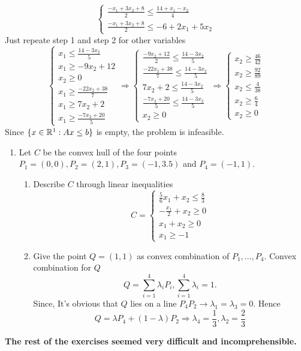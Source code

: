 \documentclass{homework}
\begin{document}
\begin{enumerate}[label=(\alph*)]
\[\begin{cases}
	  \frac{-x_1+3x_2+8}{2}\leq\frac{14+x_1-x_2}{4} \\
	  \frac{-x_1+3x_2+8}{2}\leq-6+2x_1+5x_2
	\end{cases}
	\]
	Just repeate step 1 and step 2 for other variables
	\[
	\begin{cases} 
	  x_1\leq\frac{14-3x_2}{5} \\
	  x_1\geq-9x_2+12 \\
	  x_2\geq0 \\
	  x_1\geq\frac{-22x_2+38}{7} \\
	  x_1\geq7x_2+2 \\
	  x_1\geq\frac{-7x_2+20}{5}
	\end{cases}
	\Longrightarrow
	\begin{cases} 
	  \frac{-9x_2+12}{2}\leq\frac{14-3x_2}{5} \\
	  \frac{-22x_2+38}{7}\leq\frac{14-3x_2}{5} \\
	 7x_2+2\leq\frac{14-3x_2}{5} \\
	  \frac{-7x_2+20}{5}\leq\frac{14-3x_2}{5} \\
	  x_2\geq0
	\end{cases}
	\Longrightarrow
	\begin{cases} 
	  x_2\geq\frac{46}{42} \\
	  x_2\geq\frac{92}{89} \\
	  x_2\leq\frac{4}{38} \\
	  x_2\geq\frac{6}{4} \\
	  x_2\geq0
	\end{cases}
	\]
	Since $\{x\in\mathbb R^1: Ax\leq b\}$ is empty, the problem is infeasible.
\exercise
\begin{enumerate}[label=(\alph*)]
	\item Let $C$ be the convex hull of the four points $P_1=(0,0), P_2=(2,1), P_3=(-1, 3.5)$ and $P_4=(-1,1)$.
	\begin{enumerate}[label=\roman*.]
		\item Describe $C$ through linear inequalities
		\[C=
		\begin{cases} 
		 	\frac{5}{6}x_1+x_2\leq\frac{8}{3} \\
			-\frac{x_1}{2}+x_2\geq0 \\
			x_1+x_2\geq0 \\
			x_1 \geq-1
		\end{cases}
		\]
	\item Give the point $Q = (1, 1)$ as convex combination of $P_1,\dots, P_4$.
	Convex combination for $Q$ \[Q=\sum_{i=1}^4\lambda_iP_i, \sum_{i=1}^4\lambda_i=1.\]
	Since, It's obvious that $Q$ lies on a line $P_4P_2 \rightarrow \lambda_1=\lambda_3=0$. Hence \[Q=\lambda P_4 + (1-\lambda)P_2 \Longrightarrow \lambda_4=\frac{1}{3}, \lambda_2=\frac{2}{3}\]
	\end{enumerate}
\end{enumerate}
	
\end{enumerate}
\textbf{The rest of the exercises seemed very difficult and incomprehensible.}
\end{document}
